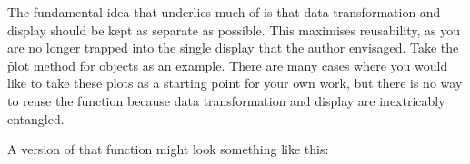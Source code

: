 The fundamental idea that underlies much of \ggplot is that data transformation and display should be kept as separate as possible.  This maximises reusability, as you are no longer trapped into the single display that the author envisaged.  Take the \f{plot} method for  objects as an example.  There are many cases where you would like to take these plots as a starting point for your own work, but there is no way to reuse the function because data transformation and display are inextricably entangled.

A \ggplot version of that function might look something like this:




